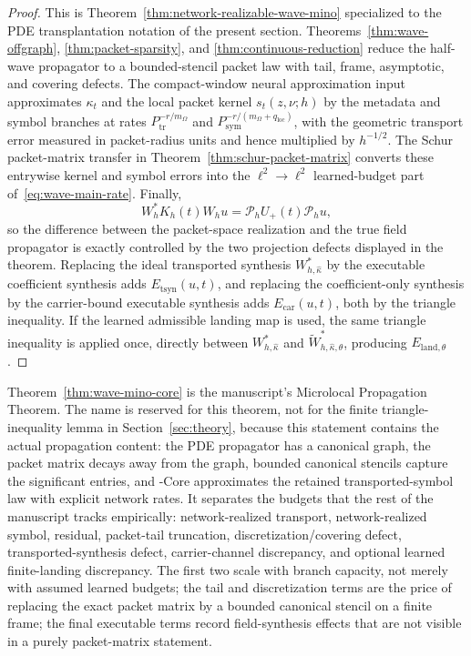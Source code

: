 \begin{proof}
This is Theorem~\ref{thm:network-realizable-wave-mino} specialized to the PDE transplantation notation of the present section. Theorems~\ref{thm:wave-offgraph}, \ref{thm:packet-sparsity}, and \ref{thm:continuous-reduction} reduce the half-wave propagator to a bounded-stencil packet law with tail, frame, asymptotic, and covering defects. The compact-window neural approximation input approximates $\kappa_t$ and the local packet kernel $s_t(z,\nu;h)$ by the metadata and symbol branches at rates $P_{\mathrm{tr}}^{-r/m_\Omega}$ and $P_{\mathrm{sym}}^{-r/(m_\Omega+q_{\mathrm{loc}})}$, with the geometric transport error measured in packet-radius units and hence multiplied by $h^{-1/2}$. The Schur packet-matrix transfer in Theorem~\ref{thm:schur-packet-matrix} converts these entrywise kernel and symbol errors into the $\ell^2\to\ell^2$ learned-budget part of~\eqref{eq:wave-main-rate}. Finally,
\[
W_h^\ast K_h(t)W_hu
=
\mathcal P_hU_+(t)\mathcal P_hu,
\]
so the difference between the packet-space realization and the true field propagator is exactly controlled by the two projection defects displayed in the theorem.
Replacing the ideal transported synthesis $W_{h,\widehat\kappa}^{\ast}$ by the executable coefficient synthesis adds $E_{\mathrm{tsyn}}(u,t)$, and replacing the coefficient-only synthesis by the carrier-bound executable synthesis adds $E_{\mathrm{car}}(u,t)$, both by the triangle inequality.  If the learned admissible landing map is used, the same triangle inequality is applied once, directly between $W_{h,\widehat\kappa}^{\ast}$ and $\widetilde W_{h,\widehat\kappa,\theta}^{\ast}$, producing $E_{\mathrm{land},\theta}$.
\end{proof}

Theorem~\ref{thm:wave-mino-core} is the manuscript's Microlocal Propagation Theorem. The name is reserved for this theorem, not for the finite triangle-inequality lemma in Section~\ref{sec:theory}, because this statement contains the actual propagation content: the PDE propagator has a canonical graph, the packet matrix decays away from the graph, bounded canonical stencils capture the significant entries, and \MiNO-Core approximates the retained transported-symbol law with explicit network rates. It separates the budgets that the rest of the manuscript tracks empirically: network-realized transport, network-realized symbol, residual, packet-tail truncation, discretization/covering defect, transported-synthesis defect, carrier-channel discrepancy, and optional learned finite-landing discrepancy. The first two scale with branch capacity, not merely with assumed learned budgets; the tail and discretization terms are the price of replacing the exact packet matrix by a bounded canonical stencil on a finite frame; the final executable terms record field-synthesis effects that are not visible in a purely packet-matrix statement.

